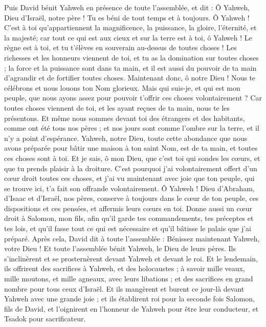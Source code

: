 \begin{multicols}{2}
Puis David bénit Yahweh en présence de toute l'assemblée, et dit : Ô Yahweh, Dieu d'Israël, notre père ! Tu es béni de tout temps et à toujours.
Ô Yahweh ! C'est à toi qu'appartiennent la magnificence, la puissance, la gloire, l'éternité, et la majesté; car tout ce qui est aux cieux et sur la terre est à toi, ô Yahweh ! Le règne est à toi, et tu t'élèves en souverain au-dessus de toutes choses !
Les richesses et les honneurs viennent de toi, et tu as la domination sur toutes choses ; la force et la puissance sont dans ta main, et il est aussi du pouvoir de ta main d'agrandir et de fortifier toutes choses.
Maintenant donc, ô notre Dieu ! Nous te célébrons et nous louons ton Nom glorieux.
Mais qui suis-je, et qui est mon peuple, que nous ayons assez pour pouvoir t'offrir ces choses volontairement ? Car toutes choses viennent de toi, et les ayant reçues de ta main, nous te les présentons.
Et même nous sommes devant toi des étrangers et des habitants, comme ont été tous nos pères ; et nos jours sont comme l'ombre sur la terre, et il n'y a point d'espérance.
Yahweh, notre Dieu, toute cette abondance que nous avons préparée pour bâtir une maison à ton saint Nom, est de ta main, et toutes ces choses sont à toi.
Et je sais, ô mon Dieu, que c'est toi qui sondes les cœurs, et que tu prends plaisir à la droiture. C'est pourquoi j'ai volontairement offert d'un cœur droit toutes ces choses, et j'ai vu maintenant avec joie que ton peuple, qui se trouve ici, t'a fait son offrande volontairement.
Ô Yahweh ! Dieu d'Abraham, d'Isaac et d'Israël, nos pères, conserve à toujours dans le cœur de ton peuple, ces dispositions et ces pensées, et affermis leurs cœurs en toi.
Donne aussi un cœur droit à Salomon, mon fils, afin qu'il garde tes commandements, tes préceptes et tes lois, et qu'il fasse tout ce qui est nécessaire et qu'il bâtisse le palais que j'ai préparé.
Après cela, David dit à toute l'assemblée : Bénissez maintenant Yahweh, votre Dieu ! Et toute l'assemblée bénit Yahweh, le Dieu de leurs pères. Ils s'inclinèrent et se prosternèrent devant Yahweh et devant le roi.
Et le lendemain, ils offrirent des sacrifices à Yahweh, et des holocaustes ; à savoir mille veaux, mille moutons, et mille agneaux, avec leurs libations ; et des sacrifices en grand nombre pour tous ceux d'Israël.
Et ils mangèrent et burent ce jour-là devant Yahweh avec une grande joie ; et ils établirent roi pour la seconde fois Salomon, fils de David, et l'oignirent en l'honneur de Yahweh pour être leur conducteur, et Tsadok pour sacrificateur.

\end{multicols}
